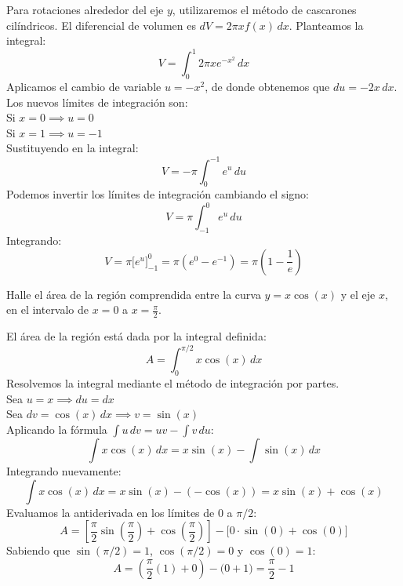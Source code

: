 \documentclass[11pt,paper=a4,answers, addpoints]{exam}
\begin{document}
\begin{questions}
\begin{solution}
Para rotaciones alrededor del eje $y$, utilizaremos el método de cascarones cilíndricos. El diferencial de volumen es $dV = 2\pi x f(x) \, dx$.
Planteamos la integral:
\[ V = \int_0^1 2\pi x e^{-x^2} \, dx \]
Aplicamos el cambio de variable $u = -x^2$, de donde obtenemos que $du = -2x \, dx$. \\
Los nuevos límites de integración son: \\
Si $x = 0 \implies u = 0$ \\
Si $x = 1 \implies u = -1$ \\
Sustituyendo en la integral:
\[ V = -\pi \int_0^{-1} e^u \, du \]
Podemos invertir los límites de integración cambiando el signo:
\[ V = \pi \int_{-1}^0 e^u \, du \]
Integrando:
\[ V = \pi \Big[ e^u \Big]_{-1}^0 = \pi (e^0 - e^{-1}) = \pi \left(1 - \frac{1}{e}\right) \]
\end{solution}

\vspace{5mm}

\question Halle el área de la región comprendida entre la curva $y = x\cos(x)$ y el eje $x$, en el intervalo de $x = 0$ a $x = \frac{\pi}{2}$.


\begin{solution}
El área de la región está dada por la integral definida:
\[ A = \int_0^{\pi/2} x\cos(x) \, dx \]
Resolvemos la integral mediante el método de integración por partes. \\
Sea $u = x \implies du = dx$ \\
Sea $dv = \cos(x) \, dx \implies v = \sin(x)$ \\
Aplicando la fórmula $\int u \, dv = uv - \int v \, du$:
\[ \int x\cos(x) \, dx = x\sin(x) - \int \sin(x) \, dx \]
Integrando nuevamente:
\[ \int x\cos(x) \, dx = x\sin(x) - (-\cos(x)) = x\sin(x) + \cos(x) \]
Evaluamos la antiderivada en los límites de $0$ a $\pi/2$:
\[ A = \left[ \frac{\pi}{2}\sin\left(\frac{\pi}{2}\right) + \cos\left(\frac{\pi}{2}\right) \right] - \Big[ 0\cdot\sin(0) + \cos(0) \Big] \]
Sabiendo que $\sin(\pi/2) = 1$, $\cos(\pi/2) = 0$ y $\cos(0) = 1$:
\[ A = \left( \frac{\pi}{2}(1) + 0 \right) - \Big( 0 + 1 \Big) = \frac{\pi}{2} - 1 \]
\end{solution}

\end{questions}
\end{document}
